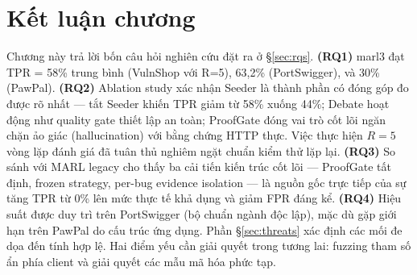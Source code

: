 \section{Kết luận chương}

Chương này trả lời bốn câu hỏi nghiên cứu đặt ra ở \S\ref{sec:rqs}. \textbf{(RQ1)} marl3 đạt TPR = 58\% trung bình (VulnShop với R=5), 63,2\% (PortSwigger), và 30\% (PawPal). \textbf{(RQ2)} Ablation study xác nhận Seeder là thành phần có đóng góp đo được rõ nhất --- tắt Seeder khiến TPR giảm từ 58\% xuống 44\%; Debate hoạt động như quality gate thiết lập an toàn; ProofGate đóng vai trò cốt lõi ngăn chặn ảo giác (hallucination) với bằng chứng HTTP thực. Việc thực hiện $R=5$ vòng lặp đánh giá đã tuân thủ nghiêm ngặt chuẩn kiểm thử lặp lại. \textbf{(RQ3)} So sánh với MARL legacy cho thấy ba cải tiến kiến trúc cốt lõi --- ProofGate tất định, frozen strategy, per-bug evidence isolation --- là nguồn gốc trực tiếp của sự tăng TPR từ 0\% lên mức thực tế khả dụng và giảm FPR đáng kể. \textbf{(RQ4)} Hiệu suất được duy trì trên PortSwigger (bộ chuẩn ngành độc lập), mặc dù gặp giới hạn trên PawPal do cấu trúc ứng dụng. Phần \S\ref{sec:threats} xác định các mối đe dọa đến tính hợp lệ. Hai điểm yếu cần giải quyết trong tương lai: fuzzing tham số ẩn phía client và giải quyết các mẫu mã hóa phức tạp.
